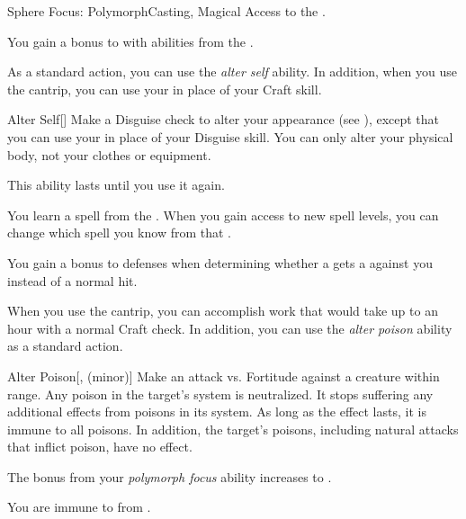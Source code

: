     \begin{feat}{Sphere Focus: Polymorph}{Casting, Magical}
        \featpre Access to the  .

         You gain a  bonus to  with abilities from the  .

         As a standard action, you can use the \textit{alter self} ability.
        In addition, when you use the  cantrip, you can use your  in place of your Craft skill.
        \begin{freeability}{Alter Self}[]
            Make a Disguise check to alter your appearance (see ), except that you can use your  in place of your Disguise skill.
            You can only alter your physical body, not your clothes or equipment.

            This ability lasts until you use it again.
        \end{freeability}

         You learn a spell from the  .
        When you gain access to new spell levels, you can change which spell you know from that .

         You gain a  bonus to defenses when determining whether a  gets a  against you instead of a normal hit.

         When you use the  cantrip, you can accomplish work that would take up to an hour with a normal Craft check.
        In addition, you can use the \textit{alter poison} ability as a standard action.
        \begin{freeability}{Alter Poison}[,  (minor)]
            Make an attack vs. Fortitude against a creature within \rngclose range.
            \hit Any poison in the target's system is neutralized.
            It stops suffering any additional effects from poisons in its system.
            As long as the effect lasts, it is immune to all poisons.
            In addition, the target's  poisons, including natural attacks that inflict poison, have no effect.
        \end{freeability}

         The bonus from your \textit{polymorph focus} ability increases to .

         You are immune to  from .
    \end{feat}

